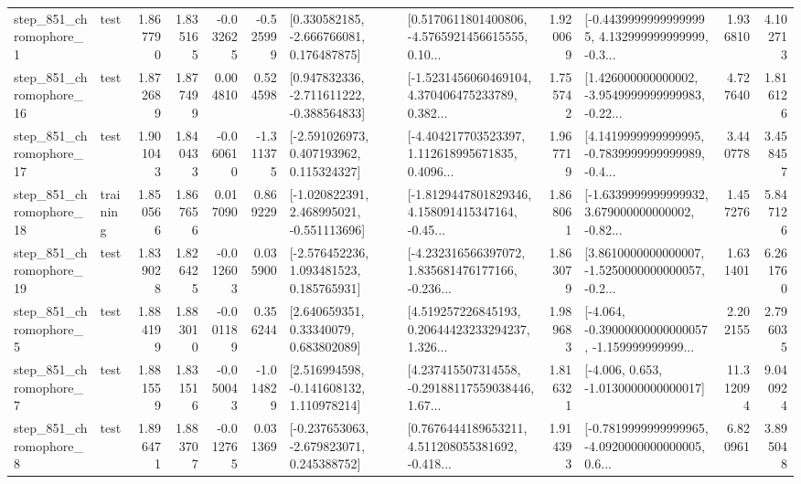 \begin{tabular}{llrrrrllrlrr}
   step\_851\_chromophore\_1 &      test &      1.867790 &    1.835165 &     -0.032625 & -0.525999 &    [0.330582185, -2.666766081, 0.176487875] &  [0.5170611801400806, -4.5765921456615555, 0.10... &       1.920069 &  [-0.44399999999999995, 4.132999999999999, -0.3... &            1.936810 &          4.102713 \\
  step\_851\_chromophore\_16 &      test &      1.872689 &    1.877499 &      0.004810 &  0.524598 &   [0.947832336, -2.711611222, -0.388564833] &  [-1.5231456060469104, 4.370406475233789, 0.382... &       1.755742 &  [1.426000000000002, -3.9549999999999983, -0.22... &            4.727640 &          1.816126 \\
  step\_851\_chromophore\_17 &      test &      1.901043 &    1.840433 &     -0.060610 & -1.311375 &    [-2.591026973, 0.407193962, 0.115324327] &  [-4.404217703523397, 1.112618995671835, 0.4096... &       1.967719 &  [4.1419999999999995, -0.7839999999999989, -0.4... &            3.440778 &          3.458457 \\
  step\_851\_chromophore\_18 &  training &      1.850566 &    1.867656 &      0.017090 &  0.869229 &   [-1.020822391, 2.468995021, -0.551113696] &  [-1.8129447801829346, 4.158091415347164, -0.45... &       1.868061 &  [-1.6339999999999932, 3.679000000000002, -0.82... &            1.457276 &          5.847126 \\
  step\_851\_chromophore\_19 &      test &      1.839028 &    1.826425 &     -0.012603 &  0.035900 &    [-2.576452236, 1.093481523, 0.185765931] &  [-4.232316566397072, 1.835681476177166, -0.236... &       1.863079 &  [3.8610000000000007, -1.5250000000000057, -0.2... &            1.631401 &          6.261760 \\
   step\_851\_chromophore\_5 &      test &      1.884199 &    1.883010 &     -0.001189 &  0.356244 &      [2.640659351, 0.33340079, 0.683802089] &  [4.519257226845193, 0.20644423233294237, 1.326... &       1.989683 &  [-4.064, -0.39000000000000057, -1.159999999999... &            2.202155 &          2.796035 \\
   step\_851\_chromophore\_7 &      test &      1.881559 &    1.831516 &     -0.050043 & -1.014829 &    [2.516994598, -0.141608132, 1.110978214] &  [4.237415507314558, -0.29188117559038446, 1.67... &       1.816321 &               [-4.006, 0.653, -1.0130000000000017] &           11.312094 &          9.040924 \\
   step\_851\_chromophore\_8 &      test &      1.896471 &    1.883707 &     -0.012765 &  0.031369 &   [-0.237653063, -2.679823071, 0.245388752] &  [0.7676444189653211, 4.511208055381692, -0.418... &       1.914393 &  [-0.7819999999999965, -4.0920000000000005, 0.6... &            6.820961 &          3.895048 \\

\end{tabular}
